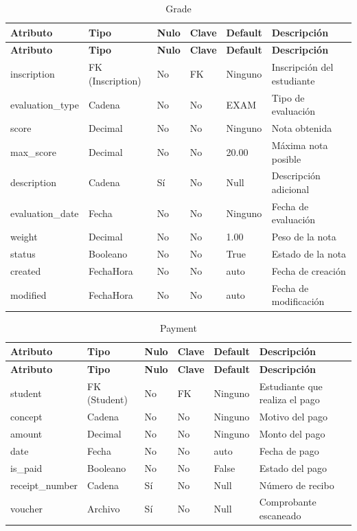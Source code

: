 \documentclass{article}
\begin{document}
\begin{longtable}{|l|l|l|l|l|l|}
\caption{Grade} \\
\hline
\rowcolor{tabledictionariesbackground}
\textbf{Atributo} & \textbf{Tipo} & \textbf{Nulo} & \textbf{Clave} & \textbf{Default} & \textbf{Descripción} \\
\hline
\endfirsthead
\hline
\rowcolor{tabledictionariesbackground}
\textbf{Atributo} & \textbf{Tipo} & \textbf{Nulo} & \textbf{Clave} & \textbf{Default} & \textbf{Descripción} \\
\hline
\endhead
inscription & FK (Inscription) & No & FK & Ninguno & Inscripción del estudiante \\
evaluation\_type & Cadena & No & No & EXAM & Tipo de evaluación \\
score & Decimal & No & No & Ninguno & Nota obtenida \\
max\_score & Decimal & No & No & 20.00 & Máxima nota posible \\
description & Cadena & Sí & No & Null & Descripción adicional \\
evaluation\_date & Fecha & No & No & Ninguno & Fecha de evaluación \\
weight & Decimal & No & No & 1.00 & Peso de la nota \\
status & Booleano & No & No & True & Estado de la nota \\
created & FechaHora & No & No & auto & Fecha de creación \\
modified & FechaHora & No & No & auto & Fecha de modificación \\
\hline
\end{longtable}

\begin{longtable}{|l|l|l|l|l|l|}
\caption{Payment} \\
\hline
\rowcolor{tabledictionariesbackground}
\textbf{Atributo} & \textbf{Tipo} & \textbf{Nulo} & \textbf{Clave} & \textbf{Default} & \textbf{Descripción} \\
\hline
\endfirsthead
\hline
\rowcolor{tabledictionariesbackground}
\textbf{Atributo} & \textbf{Tipo} & \textbf{Nulo} & \textbf{Clave} & \textbf{Default} & \textbf{Descripción} \\
\hline
\endhead
student & FK (Student) & No & FK & Ninguno & Estudiante que realiza el pago \\
concept & Cadena & No & No & Ninguno & Motivo del pago \\
amount & Decimal & No & No & Ninguno & Monto del pago \\
date & Fecha & No & No & auto & Fecha de pago \\
is\_paid & Booleano & No & No & False & Estado del pago \\
receipt\_number & Cadena & Sí & No & Null & Número de recibo \\
voucher & Archivo & Sí & No & Null & Comprobante escaneado \\
\hline
\end{longtable}
\end{document}
